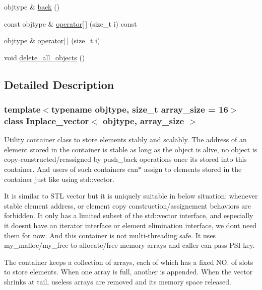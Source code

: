 \begin{DoxyCompactItemize}
\item 
objtype \& \mbox{\hyperlink{classInplace__vector_a1181edc4a42cd2200af2c30c8295a200}{back}} ()
\item 
const objtype \& \mbox{\hyperlink{classInplace__vector_a00ba1102132980fa0ddbf93a08c7ba03}{operator\mbox{[}$\,$\mbox{]}}} (size\+\_\+t i) const
\item 
objtype \& \mbox{\hyperlink{classInplace__vector_a8a67f2bea4e841845b5fbea271ecf03d}{operator\mbox{[}$\,$\mbox{]}}} (size\+\_\+t i)
\item 
void \mbox{\hyperlink{classInplace__vector_a27b8bdc0d5103bda8b03c5e9062be118}{delete\+\_\+all\+\_\+objects}} ()
\end{DoxyCompactItemize}


\subsection{Detailed Description}
\subsubsection*{template$<$typename objtype, size\+\_\+t array\+\_\+size = 16$>$\newline
class Inplace\+\_\+vector$<$ objtype, array\+\_\+size $>$}

Utility container class to store elements stably and scalably. The address of an element stored in the container is stable as long as the object is alive, no object is copy-\/constructed/reassigned by push\+\_\+back operations once it\textquotesingle{}s stored into this container. And users of such containers can$\ast$ assign to elements stored in the container just like using std\+::vector.

It is similar to S\+TL vector but it is uniquely suitable in below situation\+: whenever stable element address, or element copy construction/assignement behaviors are forbidden. It only has a limited subset of the std\+::vector interface, and especially it doesn\textquotesingle{}t have an iterator interface or element elimination interface, we don\textquotesingle{}t need them for now. And this container is not multi-\/threading safe. It uses my\+\_\+malloc/my\+\_\+free to allocate/free memory arrays and caller can pass P\+SI key.

The container keeps a collection of arrays, each of which has a fixed NO. of slots to store elements. When one array is full, another is appended. When the vector shrinks at tail, useless arrays are removed and its memory space released.


